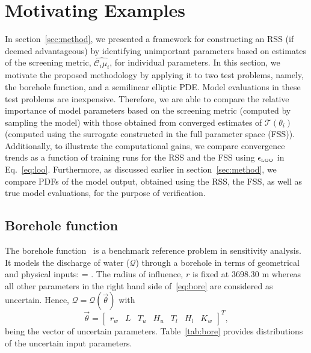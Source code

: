 \section{Motivating Examples}
\label{sec:examples}

In section~\ref{sec:method}, we presented a framework for constructing
an RSS (if deemed advantageous) by identifying unimportant parameters based on 
estimates of the screening metric, $\widehat{\mathcal{C}_i\mu_i}$,
for individual parameters.
In this section, we motivate the proposed methodology by applying it to two
test problems,
namely, the borehole function, and a semilinear elliptic PDE.
Model evaluations in these test
problems are inexpensive. Therefore, we are able to compare the 
relative importance of model parameters based
on the screening metric (computed by sampling the model) with 
those obtained from converged estimates of $\mathcal{T}(\theta_i)$ (computed
using the surrogate constructed in the
full parameter space (FSS)). Additionally, to illustrate the computational gains, 
we compare
convergence trends as a function of training runs for the RSS and the FSS using 
$\epsilon_{\mbox{\tiny LOO}}$ in Eq.~\ref{eq:loo}. 
Furthermore, as discussed earlier in section~\ref{sec:method}, we compare
PDFs of the model output, obtained using the RSS, the FSS,
as well as true model evaluations, for
the purpose of verification. 

\subsection{Borehole function}

The borehole function~\cite{Morris:1993} is a benchmark reference problem in sensitivity analysis.
It models the discharge of water ($\mathcal{Q}$) through a borehole in terms of
geometrical and physical inputs:
\be
{} = .
\label{eq:bore}
\ee
The radius of influence, $r$ is fixed at 3698.30 m whereas all other parameters
in the right hand side of~\eqref{eq:bore} are considered 
as uncertain. Hence, $\mathcal{Q} = \mathcal{Q}(\vec{\theta})$ with 
\[
\vec{\theta} = \begin{bmatrix}r_w & L & T_u & H_u & T_l & H_l & 
K_w\end{bmatrix}^T, 
\]
being the vector of
uncertain parameters. Table~\ref{tab:bore} provides distributions of the
uncertain input parameters. 


